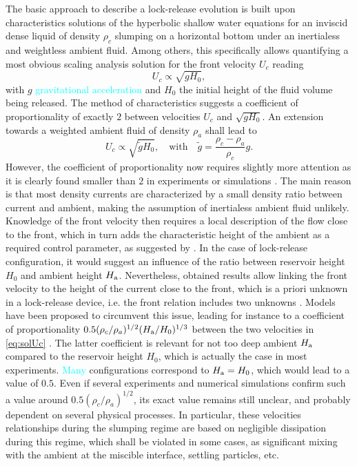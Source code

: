 \documentclass[twocolumn]{article}
\newcommand*{\marie}{\textcolor{Cyan}}
\begin{document}
The basic approach to describe a lock-release evolution is built upon characteristics solutions of the hyperbolic shallow water equations for an inviscid dense liquid of density $\rho_c$ slumping on a horizontal bottom under an inertialess and weightless ambient fluid. Among others, this specifically allows quantifying a most obvious scaling analysis solution for the front velocity $U_c$ reading
\begin{equation}
	U_c\propto \sqrt{gH_0},
\end{equation}
with $g$ \marie{gravitational acceleration} and $H_0$ the initial height of the fluid volume being released. The method of characteristics suggests a coefficient of proportionality of exactly $2$ between velocities $U_c$ and $\sqrt{g H_0}$. An extension towards a weighted ambient fluid of density $\rho_a$ shall lead to
\begin{equation}
	U_c\propto \sqrt{\tilde{g}H_0},\quad\mbox{with}\quad \tilde{g}=\frac{\rho_c-\rho_a}{\rho_c}g.
	\label{eq:solUc}
\end{equation}
However, the coefficient of proportionality now requires slightly more attention as it is clearly found smaller than $2$ in experiments or simulations \citep{??}. The main reason is that most density currents are characterized by a small density ratio between current and ambient, making the assumption of inertialess ambient fluid unlikely.
Knowledge of the front velocity then requires a local description of the flow close to the front, which in turn adds the characteristic height of the ambient as a required control parameter, as suggested by \citet{Benjamin1968}.
In the case of lock-release configuration, it would suggest an influence of the ratio between reservoir height $H_0$ and ambient height $H_\textup{a}$.
Nevertheless, obtained results allow linking the front velocity to the height of the current close to the front, which is a priori unknown in a lock-release device, i.e. the front relation includes two unknowns \citep{Benjamin1968}. Models have been proposed to circumvent this issue, leading for instance to a coefficient of proportionality $0.5 (\rho_c/\rho_a)^{1/2}(H_\textup{a}/H_0)^{1/3}$ between the two velocities in \eqref{eq:solUc} \citep{Huppert1980}. The latter coefficient is relevant for not too deep ambient $H_\textup{a}$ compared to the reservoir height $H_0$, which is actually the case in most experiments. \marie{Many} configurations correspond to $H_\textup{a}=H_0$, which would lead to a value of $0.5$. Even if several experiments and numerical simulations confirm such a value around $0.5(\rho_c/\rho_a)^{1/2}$, its exact value remains still unclear, and probably dependent on several physical processes. In particular, these velocities relationships during the slumping regime are based on negligible dissipation during this regime, which shall be violated in some cases, as significant mixing with the ambient at the miscible interface,  settling particles, etc.
\end{document}
